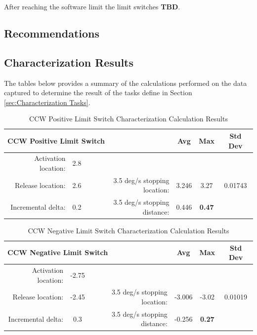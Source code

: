 \documentclass[SE,authoryear,toc, lsstdraft]{lsstdoc}
\begin{document}
After reaching the software limit the limit switches \textbf{TBD}.


\begin{landscape}
\section{Recommendations}

\subsection{Characterization Results}

The tables below provides a summary of the calculations performed on the
data captured to determine the result of the tasks define in Section \ref{sec:Characterization Tasks}.

\begin{table}[h!]
  \begin{center}
    \caption{CCW Positive Limit Switch Characterization Calculation Results}
    \label{tab:table1}
    \begin{tabular}{r|c|r|c|c|c}
    \multicolumn{3}{l|}{\textbf{CCW Positive Limit Switch}} & Avg & Max & Std Dev\\
    \midrule
    Activation location: & 2.8 & & & & \\
    Release location: & 2.6 & 3.5 deg/s stopping location: & 3.246 & 3.27 & 0.01743 \\
    Incremental delta: & 0.2 & 3.5 deg/s stopping distance: & 0.446 & \textbf{0.47} & \\
    \end{tabular}
  \end{center}
\end{table}

\begin{table}[h!]
  \begin{center}
    \caption{CCW Negative Limit Switch Characterization Calculation Results}
    \label{tab:table2}
    \begin{tabular}{r|c|r|c|c|c}
    \multicolumn{3}{l|}{\textbf{CCW Negative Limit Switch}} & Avg & Max & Std Dev\\
    \midrule
    Activation location: & -2.75 & & & & \\
    Release location: & -2.45 & 3.5 deg/s stopping location: & -3.006 & -3.02 & 0.01019 \\
    Incremental delta: & 0.3 & 3.5 deg/s stopping distance: & -0.256 & \textbf{0.27} & \\
    \end{tabular}
  \end{center}
\end{table}


\end{landscape}
\end{document}
